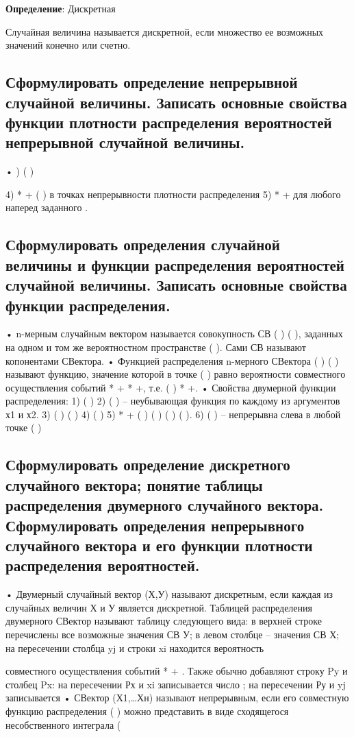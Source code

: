 \textbf{Определение}: Дискретная

Случайная величина называется дискретной, если множество ее возможных значений конечно или счетно.

\subsection{Сформулировать определение непрерывной случайной величины. Записать основные свойства функции плотности распределения вероятностей непрерывной случайной величины.}

• ) ( )



4) * + ( ) в точках непрерывности плотности распределения
5) * + для любого наперед заданного . 

\subsection{Сформулировать определения случайной величины и функции распределения вероятностей случайной величины. Записать основные свойства функции распределения.}

• n-мерным случайным вектором называется совокупность СВ
( ) ( ), заданных на одном и том же вероятностном
пространстве ( ). Сами СВ называют копонентами СВектора.
• Функцией распределения n-мерного СВектора (
)
(
) называют функцию, значение которой в точке ( )
равно вероятности совместного осуществления событий *
+ *
+, т.е. (
) *
+.
• Свойства двумерной функции распределения:
1) (
)
2) (
) – неубывающая функция по каждому из аргументов х1 и х2.
3) (
) ( )
4) ( )
5) *
+ (
) (
) (
) (
).
6) (
) – непрерывна слева в любой точке ( )

\subsection{Сформулировать определение дискретного случайного вектора; понятие таблицы распределения двумерного случайного вектора. Сформулировать определения непрерывного случайного вектора и его функции плотности распределения вероятностей.}

• Двумерный случайный вектор (Х,У) называют дискретным, если каждая из случайных величин Х и У является дискретной.
Таблицей распределения двумерного СВектор называют таблицу следующего вида:
в верхней строке перечислены все возможные значения
СВ У; в левом столбце – значения
СВ Х;
на пересечении столбца yj и строки xi находится вероятность {
	
} совместного осуществления событий *
+ {
}.
Также обычно добавляют строку Py и столбец Px:
на пересечении Рх и xi записывается число ; на пересечении Ру и yj записывается
• СВектор (Х1,…Хн) называют непрерывным, если его совместную функцию распределения
(
) можно представить в виде
сходящегося несобственного интеграла (

